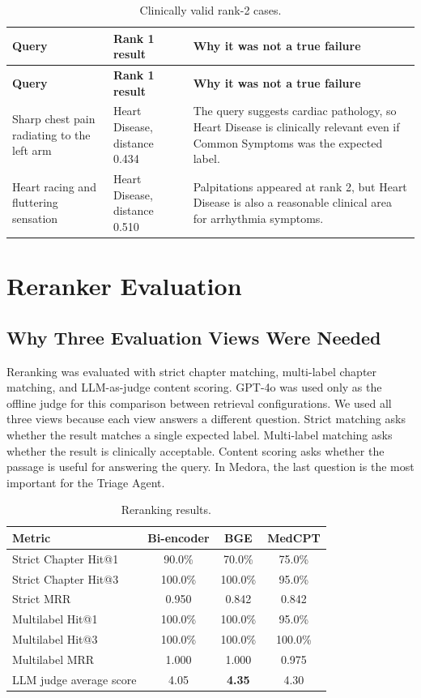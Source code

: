 \begin{longtable}{p{} p{} p{}}
\caption{Clinically valid rank-2 cases.}
\label{tab:rank2_cases}\\
\toprule
\textbf{Query} & \textbf{Rank 1 result} & \textbf{Why it was not a true failure}\\
\midrule
\endfirsthead
\toprule
\textbf{Query} & \textbf{Rank 1 result} & \textbf{Why it was not a true failure}\\
\midrule
\endhead
Sharp chest pain radiating to the left arm & Heart Disease, distance 0.434 & The query suggests cardiac pathology, so Heart Disease is clinically relevant even if Common Symptoms was the expected label.\\
Heart racing and fluttering sensation & Heart Disease, distance 0.510 & Palpitations appeared at rank 2, but Heart Disease is also a reasonable clinical area for arrhythmia symptoms.\\
\bottomrule
\end{longtable}

\section{Reranker Evaluation}

\subsection{Why Three Evaluation Views Were Needed}

Reranking was evaluated with strict chapter matching, multi-label chapter matching, and LLM-as-judge content scoring. GPT-4o was used only as the offline judge for this comparison between retrieval configurations. We used all three views because each view answers a different question. Strict matching asks whether the result matches a single expected label. Multi-label matching asks whether the result is clinically acceptable. Content scoring asks whether the passage is useful for answering the query. In Medora, the last question is the most important for the Triage Agent.

\begin{table}[htbp]
\centering
\caption{Reranking results.}
\label{tab:reranking_summary_results}
\begin{tabular}{p{} c c c}
\toprule
\textbf{Metric} & \textbf{Bi-encoder} & \textbf{BGE} & \textbf{MedCPT}\\
\midrule
Strict Chapter Hit@1 & 90.0\% & 70.0\% & 75.0\%\\
Strict Chapter Hit@3 & 100.0\% & 100.0\% & 95.0\%\\
Strict MRR & 0.950 & 0.842 & 0.842\\
Multilabel Hit@1 & 100.0\% & 100.0\% & 95.0\%\\
Multilabel Hit@3 & 100.0\% & 100.0\% & 100.0\%\\
Multilabel MRR & 1.000 & 1.000 & 0.975\\
LLM judge average score & 4.05 & \textbf{4.35} & 4.30\\
\bottomrule
\end{tabular}
\end{table}

